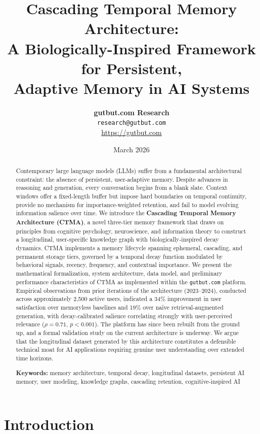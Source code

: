 \documentclass[11pt,a4paper]{article}
\title{
  \textbf{Cascading Temporal Memory Architecture:}\\[6pt]
  \Large A Biologically-Inspired Framework for Persistent,\\
  Adaptive Memory in AI Systems
}
\author{
  \textbf{gutbut.com Research}\\
  \texttt{research@gutbut.com}\\
  \url{https://gutbut.com}
}
\date{March 2026}
\begin{document}
\maketitle

\begin{abstract}
Contemporary large language models (LLMs) suffer from a fundamental architectural constraint: the absence of persistent, user-adaptive memory. Despite advances in reasoning and generation, every conversation begins from a blank slate. Context windows offer a fixed-length buffer but impose hard boundaries on temporal continuity, provide no mechanism for importance-weighted retention, and fail to model evolving information salience over time. We introduce the \textbf{Cascading Temporal Memory Architecture (CTMA)}, a novel three-tier memory framework that draws on principles from cognitive psychology, neuroscience, and information theory to construct a longitudinal, user-specific knowledge graph with biologically-inspired decay dynamics. CTMA implements a memory lifecycle spanning ephemeral, cascading, and permanent storage tiers, governed by a temporal decay function modulated by behavioral signals, recency, frequency, and contextual importance. We present the mathematical formalization, system architecture, data model, and preliminary performance characteristics of CTMA as implemented within the \texttt{gutbut.com} platform. Empirical observations from prior iterations of the architecture (2023--2024), conducted across approximately 2,500 active users, indicated a 34\% improvement in user satisfaction over memoryless baselines and 19\% over na\"ive retrieval-augmented generation, with decay-calibrated salience correlating strongly with user-perceived relevance ($\rho = 0.71$, $p < 0.001$). The platform has since been rebuilt from the ground up, and a formal validation study on the current architecture is underway. We argue that the longitudinal dataset generated by this architecture constitutes a defensible technical moat for AI applications requiring genuine user understanding over extended time horizons.

\vspace{6pt}
\noindent\textbf{Keywords:} memory architecture, temporal decay, longitudinal datasets, persistent AI memory, user modeling, knowledge graphs, cascading retention, cognitive-inspired AI
\end{abstract}

\section{Introduction}
\label{sec:intro}
\end{document}

